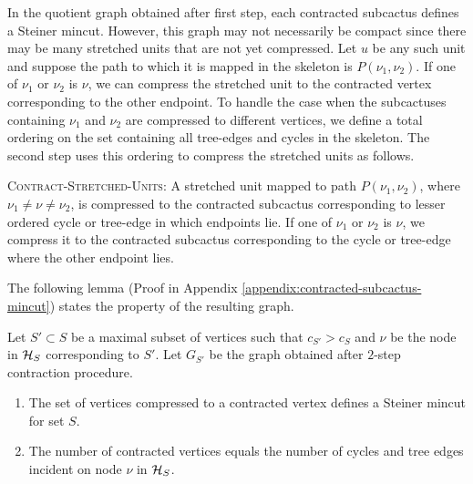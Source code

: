 In the quotient graph obtained after first step, each contracted subcactus defines a Steiner mincut. 
However, this graph may not necessarily be compact since there may be many stretched units that are not yet compressed. 
Let $u$ be any such unit and suppose
the path to which it is mapped in the skeleton is $P(\nu_1,\nu_2)$. If one of $\nu_1$ or $\nu_2$ is $\nu$, we can compress the stretched unit to the contracted vertex corresponding to the other endpoint. To handle the case when the subcactuses containing $\nu_1$ and $\nu_2$ are compressed to different vertices,
we define a total ordering on the set containing all tree-edges and cycles in the skeleton. The second step uses this ordering to compress the stretched units as follows.


{\textsc{Contract-Stretched-Units}}: A stretched unit mapped to path $P(\nu_1,\nu_2)$, where $\nu_1\neq \nu \neq \nu_2$, is compressed to the contracted subcactus corresponding to lesser ordered cycle or tree-edge in which endpoints lie. If one of $\nu_1$ or $\nu_2$ is $\nu$, we compress it to the contracted subcactus corresponding to the cycle or tree-edge where the other endpoint lies.

The following lemma (Proof in Appendix \ref{appendix:contracted-subcactus-mincut}) states the property of the resulting graph.

\begin{lemma}
Let $S'\subset S$ be a maximal subset of vertices such that $c_{S'}>c_S$ and $\nu$ be the node in ${\cal H}_S$ corresponding to $S'$. Let $G_{S'}$ be the graph obtained after %
$2$-step contraction procedure. 
\begin{enumerate}
    \item The set of vertices compressed to a contracted vertex defines a Steiner mincut for set $S$.
    \item The number of contracted vertices equals the number of cycles and tree edges incident on node $\nu$ in ${\cal H}_S$.
\end{enumerate}
\label{lem:contracted-subcactus-mincut}
\end{lemma}

